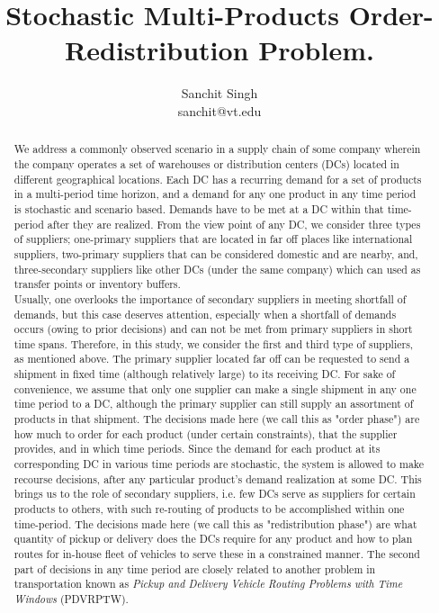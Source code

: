 \documentclass[12pt,a4paper]{article}
\title{Stochastic Multi-Products Order-Redistribution Problem.\\ }
\author{%
	Sanchit Singh \\
	sanchit@vt.edu \\
	\vspace{20pt}
	}
\makeatletter
\def\printtitle{%
    {\color{bl} \centering \huge \sc \textbf{\@title}\par}}		%
\def\printauthor{%
    {\centering \small \@author}}				%
\makeatother
\begin{document}

\printtitle 

\printauthor

\begin{abstract}
We address a commonly observed scenario in a supply chain of some company wherein the company operates a set of warehouses or distribution centers (DCs) located in different geographical locations. Each DC has a recurring demand for a set of products in a multi-period time horizon, and a demand for any one product in any time period is stochastic and scenario based. Demands have to be met at a DC within that time-period after they are realized. From the view point of any DC, we  consider three types of suppliers; one-primary suppliers that are located in far off places like international suppliers, two-primary suppliers that can be considered domestic and are nearby, and, three-secondary suppliers like other DCs (under the same company) which can used as transfer points or inventory buffers. \\
Usually, one overlooks the importance of secondary suppliers in meeting shortfall of demands, but this case deserves attention, especially when a shortfall of demands occurs (owing to prior decisions) and can not be met from primary suppliers in short time spans. Therefore, in this study, we consider the first and third type of suppliers, as mentioned above. The primary supplier located far off can be requested to send a shipment in fixed time (although relatively large) to its receiving DC. For sake of convenience, we assume that only one supplier can make a single shipment in any one time period to a DC, although the primary supplier can still supply an assortment of products in that shipment. The decisions made here (we call this as "order phase") are how much to order for each product (under certain constraints), that the supplier provides, and in which time periods. Since the demand for each product at its corresponding DC in various time periods are stochastic, the system is allowed to make recourse decisions, after any particular product's demand realization at some DC. This brings us to the role of secondary suppliers, i.e. few DCs serve as suppliers for certain products to others, with such re-routing of products to be accomplished within one time-period. The decisions made here (we call this as "redistribution phase") are what quantity of pickup or delivery does the DCs require for any product and how to plan routes for in-house fleet of vehicles to serve these in a constrained manner. The second part of decisions in any time period are closely related to another problem in transportation known as \emph{Pickup and Delivery Vehicle Routing Problems with Time Windows} (PDVRPTW). \\

\end{abstract}
\end{document}
